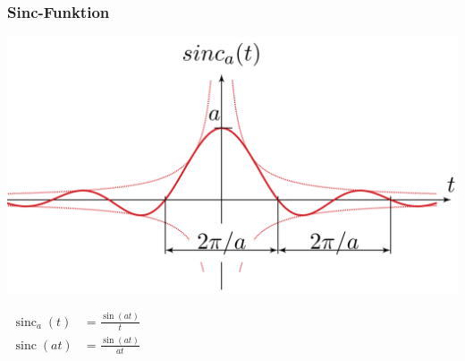 		\subsubsection{Sinc-Funktion}
			\begin{minipage}{0.2\textwidth}
				\includegraphics[width=\textwidth]{./bilder/funktionen/sincF.png}
			\end{minipage}
			\qquad
			\begin{minipage}{0.45\textwidth}
				\begin{math}
					\begin{aligned}
						\operatorname{sinc}_{a}(t) &= \frac{\sin (a t)}{t} \\
						\operatorname{sinc}(a t) &= \frac{\sin (a t)}{a t}
					\end{aligned}
				\end{math}
			\end{minipage}
			\qquad
			\begin{minipage}{0.25\textwidth}						
			\end{minipage}\\
	
	
	